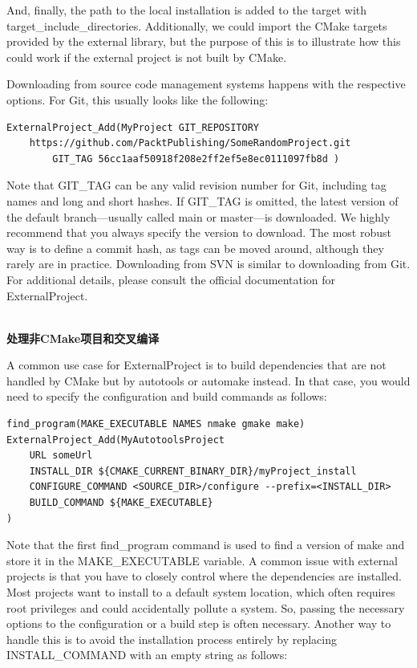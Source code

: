 And, finally, the path to the local installation is added to the target with target\_include\_directories. Additionally, we could import the CMake targets provided by the external library, but the purpose of this is to illustrate how this could work if the external project is not built by CMake.

Downloading from source code management systems happens with the respective options. For Git, this usually looks like the following:

\begin{lstlisting}[style=styleCMake]
ExternalProject_Add(MyProject GIT_REPOSITORY
	https://github.com/PacktPublishing/SomeRandomProject.git
		GIT_TAG 56cc1aaf50918f208e2ff2ef5e8ec0111097fb8d )
\end{lstlisting}

Note that GIT\_TAG can be any valid revision number for Git, including tag names and long and short hashes. If GIT\_TAG is omitted, the latest version of the default branch—usually called main or master—is downloaded. We highly recommend that you always specify the version to download. The most robust way is to define a commit hash, as tags can be moved around, although they rarely are in practice. Downloading from SVN is similar to downloading from Git. For additional details, please consult the official documentation for ExternalProject.

\hspace*{\fill} \\ %
\noindent
\textbf{处理非CMake项目和交叉编译}

A common use case for ExternalProject is to build dependencies that are not handled by CMake but by autotools or automake instead. In that case, you would need to specify the configuration and build commands as follows:

\begin{lstlisting}[style=styleCMake]
find_program(MAKE_EXECUTABLE NAMES nmake gmake make)
ExternalProject_Add(MyAutotoolsProject
	URL someUrl
	INSTALL_DIR ${CMAKE_CURRENT_BINARY_DIR}/myProject_install
	CONFIGURE_COMMAND <SOURCE_DIR>/configure --prefix=<INSTALL_DIR>
	BUILD_COMMAND ${MAKE_EXECUTABLE}
)
\end{lstlisting}

Note that the first find\_program command is used to find a version of make and store it in the MAKE\_EXECUTABLE variable. A common issue with external projects is that you have to closely control where the dependencies are installed. Most projects want to install to a default system location, which often requires root privileges and could accidentally pollute a system. So, passing the necessary options to the configuration or a build step is often necessary. Another way to handle this is to avoid the installation process entirely by replacing INSTALL\_COMMAND with an empty string as follows:

